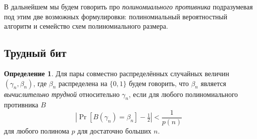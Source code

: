 \documentclass[12pt]{article}
\newcommand{\bits}{\{0,1\}}
\theoremstyle{definition}
\newtheorem{definition}{Определение}[section]
\theoremstyle{plain}
\theoremstyle{remark}
\begin{document}
В дальнейшем мы будем говорить про \emph{полиномиального противника}
подразумевая под этим две возможных формулировки: полиномиальный
вероятностный алгоритм и семейство схем полиномиального размера.

\subsection{Трудный бит}
\begin{definition}
Для пары совместно распределённых случайных величин $(\gamma_n,\beta_n)$, где $\beta_n$ распределена на
$\bits$ будем говорить, что $\beta_n$ является \emph{вычислительно трудной} относительно $\gamma_n$, 
если для любого полиномиального противника $B$
$$\left|\Pr[B(\gamma_n) = \beta_n] - \tfrac12\right| < \frac{1}{p(n)}$$
для любого полинома $p$ для достаточно больших $n$.
\end{definition}
\end{document}
